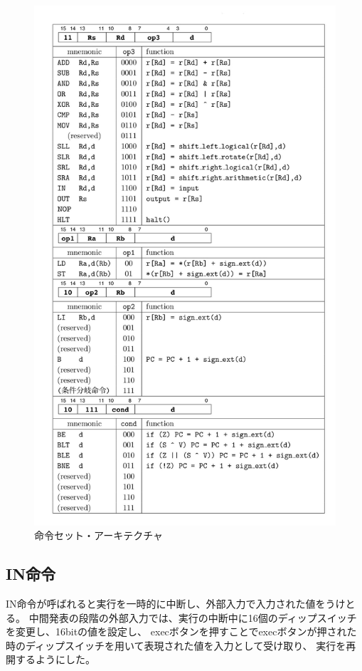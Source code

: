 \documentclass[a4j,titlepage]{jarticle}
\begin{document}
\begin{figure}[H]
    \begin{center}
    \includegraphics[scale = 0.22]{instructionSet.jpg}
    \end{center}
    \caption{命令セット・アーキテクチャ}
    \label{instructionSet}
\end{figure}

\subsection{IN命令}
IN命令が呼ばれると実行を一時的に中断し、外部入力で入力された値をうけとる。
中間発表の段階の外部入力では、実行の中断中に16個のディップスイッチを変更し、16bitの値を設定し、
execボタンを押すことでexecボタンが押された時のディップスイッチを用いて表現された値を入力として受け取り、
実行を再開するようにした。
\end{document}
